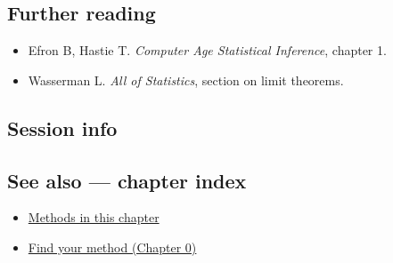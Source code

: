 \documentclass[
]{article}
\newenvironment{Shaded}{\begin{snugshade}}{\end{snugshade}}
\providecommand{\tightlist}{%
  \setlength{\itemsep}{0pt}\setlength{\parskip}{0pt}}
\begin{document}
\subsection{Further reading}\label{further-reading}

\begin{itemize}
\tightlist
\item
  Efron B, Hastie T. \emph{Computer Age Statistical Inference}, chapter
  1.
\item
  Wasserman L. \emph{All of Statistics}, section on limit theorems.
\end{itemize}

\subsection{Session info}\label{session-info}

\begin{Shaded}
\begin{Highlighting}[]

\end{Highlighting}
\end{Shaded}

\subsection{See also --- chapter index}\label{see-also-chapter-index}

\begin{itemize}
\tightlist
\item
  \href{../index.Rmd}{Methods in this chapter}
\item
  \href{../../../ch00-find-your-method.Rmd}{Find your method (Chapter
  0)}
\end{itemize}
\end{document}
